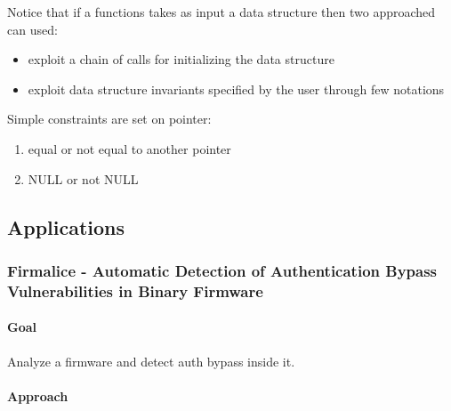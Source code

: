 Notice that if a functions takes as input a data structure then two approached can used:
\begin{itemize}
  \item exploit a chain of calls for initializing the data structure
  \item exploit data structure invariants specified by the user through few notations
\end{itemize}

Simple constraints are set on pointer:
\begin{enumerate}
  \item equal or not equal to another pointer
  \item NULL or not NULL
\end{enumerate}

\subsection{Applications}

\subsubsection{\cite{FIRMALICE-NDSS15} Firmalice - Automatic Detection of Authentication Bypass Vulnerabilities in Binary Firmware} 

\paragraph{Goal}
Analyze a firmware and detect auth bypass inside it.

\paragraph{Approach}

